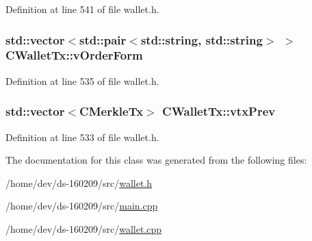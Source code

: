 Definition at line 541 of file wallet.\+h.

\hypertarget{class_c_wallet_tx_a923dbbba343b8f4d1c3d89ae73bdcea0}{}
\subsubsection[{v\+Order\+Form}]{\setlength{\rightskip}{0pt plus 5cm}std\+::vector$<$std\+::pair$<$std\+::string, std\+::string$>$ $>$ C\+Wallet\+Tx\+::v\+Order\+Form}\label{class_c_wallet_tx_a923dbbba343b8f4d1c3d89ae73bdcea0}


Definition at line 535 of file wallet.\+h.

\hypertarget{class_c_wallet_tx_ae122d2e0ce296bd9dfc63eb3ede5ce98}{}
\subsubsection[{vtx\+Prev}]{\setlength{\rightskip}{0pt plus 5cm}std\+::vector$<${\bf C\+Merkle\+Tx}$>$ C\+Wallet\+Tx\+::vtx\+Prev}\label{class_c_wallet_tx_ae122d2e0ce296bd9dfc63eb3ede5ce98}


Definition at line 533 of file wallet.\+h.



The documentation for this class was generated from the following files\+:\begin{DoxyCompactItemize}
\item 
/home/dev/ds-\/160209/src/\hyperlink{wallet_8h}{wallet.\+h}\item 
/home/dev/ds-\/160209/src/\hyperlink{main_8cpp}{main.\+cpp}\item 
/home/dev/ds-\/160209/src/\hyperlink{wallet_8cpp}{wallet.\+cpp}\end{DoxyCompactItemize}
